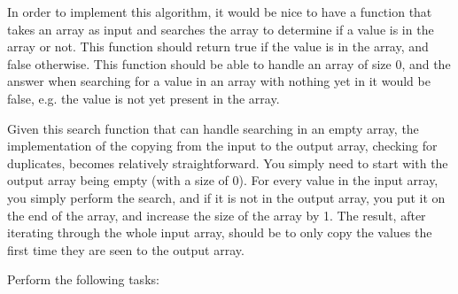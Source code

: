 \documentclass[11pt]{article}
\begin{document}
In order to implement this algorithm, it would be nice to have a
function that takes an array as input and searches the array to
determine if a value is in the array or not.  This function should
return true if the value is in the array, and false otherwise.  This
function should be able to handle an array of size 0, and the answer
when searching for a value in an array with nothing yet in it would be
false, e.g. the value is not yet present in the array.

Given this search function that can handle searching in an empty
array, the implementation of the copying from the input to the
output array, checking for duplicates, becomes relatively
straightforward.  You simply need to start with the output array
being empty (with a size of 0).  For every value in the input array,
you simply perform the search, and if it is not in the output array,
you put it on the end of the array, and increase the size of the array
by 1.  The result, after iterating through the whole input array, should
be to only copy the values the first time they are seen to the output
array.

Perform the following tasks:
\end{document}
